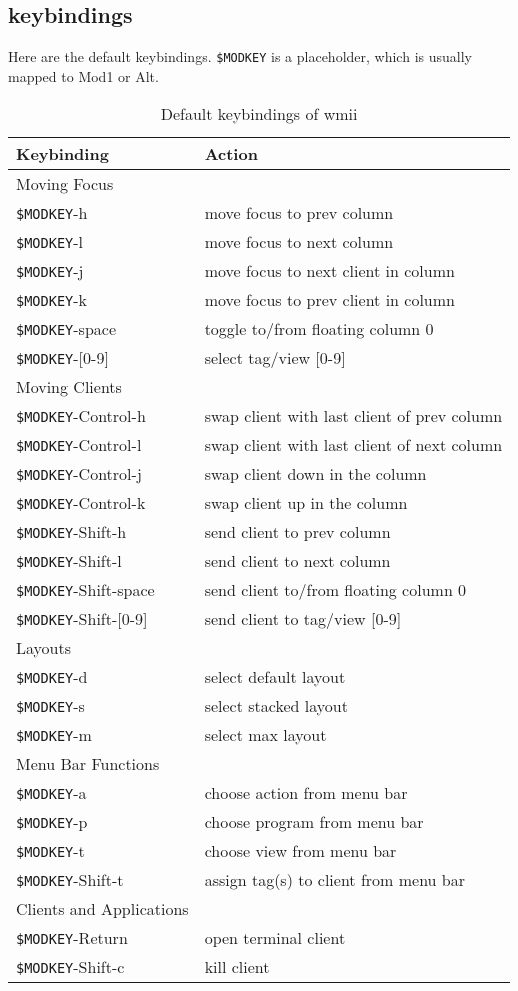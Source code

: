 \documentclass[12pt,a4paper]{article} %
\begin{document}
\newpage

\subsection{keybindings}
Here are the default keybindings. \verb+$MODKEY+ is a placeholder, which is
usually mapped to Mod1 or Alt.
\begin{table}[h]
\begin{tabular}{|l|l|}
\hline %
Keybinding &Action \\ %
\hline 
\hline 
Moving Focus&\\
\verb+$MODKEY+-h&move focus to prev column \\
\verb+$MODKEY+-l&move focus to next column \\
\verb+$MODKEY+-j&move focus to next client in column \\
\verb+$MODKEY+-k&move focus to prev client in column \\
\verb+$MODKEY+-space&toggle to/from floating column 0 \\
\verb+$MODKEY+-[0-9]&select tag/view [0-9] \\
Moving Clients&\\
\verb+$MODKEY+-Control-h&swap client with last client of prev column \\
\verb+$MODKEY+-Control-l&swap client with last client of next column \\
\verb+$MODKEY+-Control-j&swap client down in the column \\
\verb+$MODKEY+-Control-k&swap client up in the column \\
\verb+$MODKEY+-Shift-h&send client to prev column \\
\verb+$MODKEY+-Shift-l&send client to next column \\
\verb+$MODKEY+-Shift-space&send client to/from floating column 0 \\
\verb+$MODKEY+-Shift-[0-9]&send client to tag/view [0-9] \\
Layouts&\\
\verb+$MODKEY+-d&select default layout \\
\verb+$MODKEY+-s&select stacked layout \\
\verb+$MODKEY+-m&select max layout \\
Menu Bar Functions&\\
\verb+$MODKEY+-a&choose action from menu bar \\
\verb+$MODKEY+-p&choose program from menu bar \\
\verb+$MODKEY+-t&choose view from menu bar \\
\verb+$MODKEY+-Shift-t&assign tag(s)  to client from menu bar \\
Clients and Applications&\\
\verb+$MODKEY+-Return&open terminal client \\
\verb+$MODKEY+-Shift-c&kill client \\
\hline 
\end{tabular} 
\caption{Default keybindings of wmii} 
\end{table}
\end{document}
